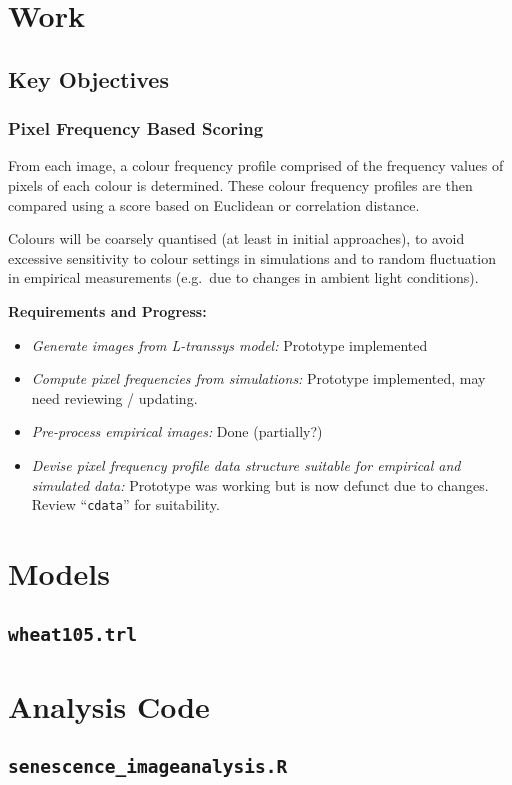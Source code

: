 \documentclass[a4paper,fleqn]{article}
\begin{document}
\section{Work}

\subsection{Key Objectives}

\subsubsection{Pixel Frequency Based Scoring}

From each image, a colour frequency profile comprised of the frequency
values of pixels of each colour is determined. These colour frequency
profiles are then compared using a score based on Euclidean or
correlation distance.

Colours will be coarsely quantised (at least in initial approaches),
to avoid excessive sensitivity to colour settings in simulations
and to random fluctuation in empirical measurements (e.g.\ due to
changes in ambient light conditions).


\textbf{Requirements and Progress:}

\begin{itemize}
\item \textit{Generate images from L-transsys model:} Prototype
implemented
\item \textit{Compute pixel frequencies from simulations:} Prototype
  implemented, may need reviewing / updating.
\item \textit{Pre-process empirical images:} Done (partially?)
\item \textit{Devise pixel frequency profile data structure suitable
    for empirical and simulated data:} Prototype was working but is
  now defunct due to changes. Review ``\texttt{cdata}'' for
  suitability.
\end{itemize}


\appendix

\section{Models}

\subsection{\texttt{wheat105.trl}}

\begin{footnotesize}
\end{footnotesize}


\section{Analysis Code}

\subsection{\texttt{senescence\_imageanalysis.R}}

\begin{footnotesize}
\end{footnotesize}
\end{document}
